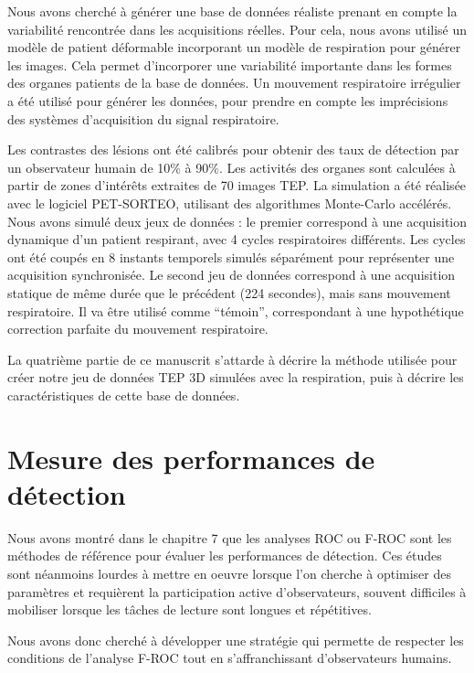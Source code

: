 Nous avons cherché à générer une base de données réaliste prenant en compte la variabilité rencontrée dans les acquisitions réelles. Pour cela, nous avons utilisé un modèle de patient déformable incorporant un modèle de respiration pour générer les images. Cela permet d'incorporer une variabilité importante dans les formes des organes patients de la base de données. Un mouvement respiratoire irrégulier a été utilisé pour générer les données, pour prendre en compte les imprécisions des systèmes d'acquisition du signal respiratoire. 


Les contrastes des lésions ont été calibrés pour obtenir des taux de détection par un observateur humain de 10\% à 90\%. Les activités des organes sont calculées à partir de zones d'intérêts extraites de 70 images TEP. La simulation a été réalisée avec le logiciel PET-SORTEO, utilisant des algorithmes Monte-Carlo accélérés. Nous avons simulé deux jeux de données : le premier correspond à une acquisition dynamique d'un patient respirant, avec 4 cycles respiratoires différents. Les cycles ont été coupés en 8 instants temporels simulés séparément pour représenter une acquisition synchronisée. Le second jeu de données correspond à une acquisition statique de même durée que le précédent (224 secondes), mais sans mouvement respiratoire. Il va être utilisé comme ``témoin'', correspondant à une hypothétique correction parfaite du mouvement respiratoire.

La quatrième partie de ce manuscrit s'attarde à décrire la méthode utilisée pour créer notre jeu de données TEP 3D simulées avec la respiration, puis à décrire les caractéristiques de cette base de données.

\section{Mesure des performances de détection}

Nous avons montré dans le chapitre 7 que les analyses ROC ou F-ROC sont les méthodes de référence pour évaluer les performances de détection. Ces études sont néanmoins lourdes à mettre en oeuvre lorsque l'on cherche à optimiser des paramètres et requièrent la participation active d'observateurs, souvent difficiles à mobiliser lorsque les tâches de lecture sont longues et répétitives.

Nous avons donc cherché à développer une stratégie qui permette de respecter les conditions de l'analyse F-ROC tout en s'affranchissant d'observateurs humains.

